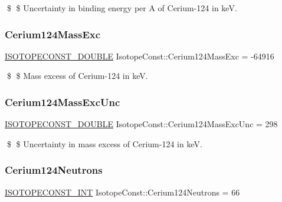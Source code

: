 \$ \$ Uncertainty in binding energy per A of Cerium-\/124 in keV. \mbox{\label{group___isotope_const-_cerium-_ce124_gae25d5a5bbfb87d6b4447e5c8008c620a}} 
\subsubsection{\texorpdfstring{Cerium124\+Mass\+Exc}{Cerium124MassExc}}
{\footnotesize\ttfamily \mbox{\hyperlink{group___isotope_const-_macros_ga8f45a7272ce02c0b4c65c44636ed719a}{I\+S\+O\+T\+O\+P\+E\+C\+O\+N\+S\+T\+\_\+\+D\+O\+U\+B\+LE}} Isotope\+Const\+::\+Cerium124\+Mass\+Exc = -\/64916}

\$ \$ Mass excess of Cerium-\/124 in keV. \mbox{\label{group___isotope_const-_cerium-_ce124_ga016ffd2951589763c218c3ccb646a325}} 
\subsubsection{\texorpdfstring{Cerium124\+Mass\+Exc\+Unc}{Cerium124MassExcUnc}}
{\footnotesize\ttfamily \mbox{\hyperlink{group___isotope_const-_macros_ga8f45a7272ce02c0b4c65c44636ed719a}{I\+S\+O\+T\+O\+P\+E\+C\+O\+N\+S\+T\+\_\+\+D\+O\+U\+B\+LE}} Isotope\+Const\+::\+Cerium124\+Mass\+Exc\+Unc = 298}

\$ \$ Uncertainty in mass excess of Cerium-\/124 in keV. \mbox{\label{group___isotope_const-_cerium-_ce124_ga7439896d54255d80bfbfc9fe49ad6f12}} 
\subsubsection{\texorpdfstring{Cerium124\+Neutrons}{Cerium124Neutrons}}
{\footnotesize\ttfamily \mbox{\hyperlink{group___isotope_const-_macros_ga5f18360b3e99483a35c32d789e62621c}{I\+S\+O\+T\+O\+P\+E\+C\+O\+N\+S\+T\+\_\+\+I\+NT}} Isotope\+Const\+::\+Cerium124\+Neutrons = 66}

